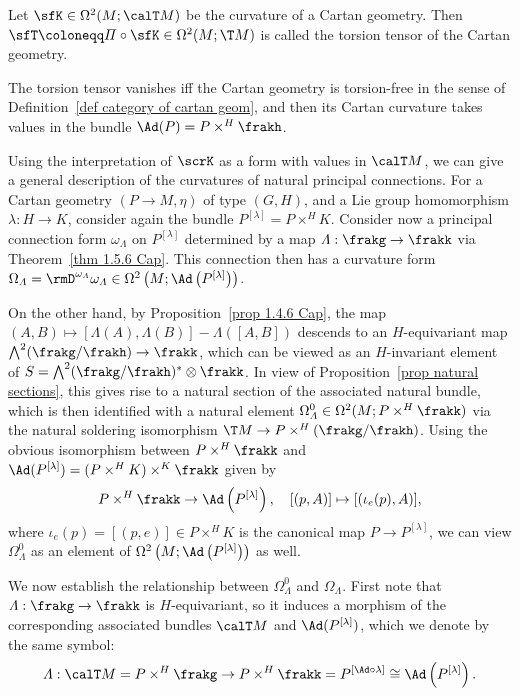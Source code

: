 \begin{defn}
    Let $\sfK\in\Omega^2(M;\calT M)$ be the curvature of a Cartan geometry. Then $\sfT\coloneqq \varPi\circ\sfK\in\Omega^2(M;\T M)$ is called the torsion tensor of the Cartan geometry.

    The torsion tensor vanishes iff the Cartan geometry is torsion-free in the sense of Definition~\ref{def category of cartan geom}, and then its Cartan curvature takes values in the bundle $\Ad(P)=P\times^H \frakh$.
\end{defn}

Using the interpretation of $\scrK$ as a form with values in $\calT M$, we can give a general description of the curvatures of natural principal connections. For a Cartan geometry $(P\to M,\eta)$ of type $(G,H)$, and a Lie group homomorphism $\lambda:H\to K$, consider again the bundle $P^{[\lambda]}=P\times^H K$. Consider now a principal connection form $\omega_\varLambda$ on $P^{[\lambda]}$ determined by a map $\varLambda:\frakg\to\frakk$ via Theorem~\ref{thm 1.5.6 Cap}. This connection then has a curvature form $\Omega_\varLambda=\rmD^{\omega_\varLambda}\omega_\varLambda\in\Omega^2\left(M;\Ad\left(P^{[\lambda]}\right)\right)$.

On the other hand, by Proposition~\ref{prop 1.4.6 Cap}, the map $(A,B)\mapsto [\varLambda(A),\varLambda(B)]-\varLambda([A,B])$ descends to an $H$-equivariant map $\bigwedge\nolimits^2(\frakg\slash\frakh)\to \frakk$, which can be viewed as an $H$-invariant element of $S=\bigwedge\nolimits^2(\frakg\slash\frakh)^\ast\otimes\frakk$. In view of Proposition~\ref{prop natural sections}, this gives rise to a natural section of the associated natural bundle, which is then identified with a natural element $\Omega^0_\varLambda\in\Omega^2(M;P\times^H \frakk)$ via the natural soldering isomorphism $\T M\to P\times^H(\frakg\slash\frakh)$.  Using the obvious isomorphism between $P\times^H \frakk$ and $\Ad(P^{[\lambda]})=(P\times^H K)\times^K\frakk$ given by 
\[P\times^H \frakk\to \Ad\left(P^{[\lambda]}\right),\quad [(p,A)]\mapsto [(\iota_e(p),A)],\]
where $\iota_e(p)=[(p,e)]\in P\times^H K$ is the canonical map $P\to P^{[\lambda]}$, we can view $\Omega^0_\varLambda$ as an element of $\Omega^2\left(M;\Ad\left(P^{[\lambda]}\right)\right)$ as well.

We now establish the relationship between $\Omega^0_\varLambda$ and $\Omega_\varLambda$. First note that $\varLambda:\frakg\to \frakk$ is $H$-equivariant, so it induces a morphism of the corresponding associated bundles $\calT M$ and $\Ad(P^{[\lambda]})$, which we denote by the same symbol:
\[\varLambda: \calT M=P\times^H\frakg\to P\times^H \frakk =P^{[\Ad\circ \lambda]}\cong \Ad\left(P^{[\lambda]}\right).\]



